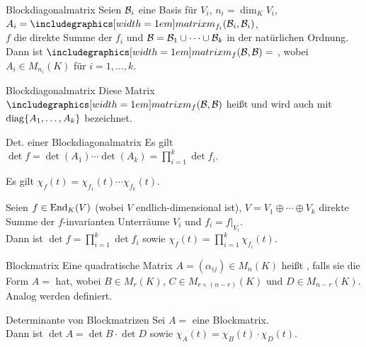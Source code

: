 \begin{Lemma}{Blockdiagonalmatrix}
    Seien $\mathcal{B}_i$ eine Basis für $V_i$, $n_i = \dim_K V_i$,
    $A_i = \matrixm_{f_i}(\basis{B}_i, \basis{B}_i)$, \\
    $f$ die direkte Summe der $f_i$ und
    $\mathcal{B} = \mathcal{B}_1 \cup \cdots \cup \mathcal{B}_k$
    in der natürlichen Ordnung. \\
    Dann ist $\hommatrix{f}{B}{B} =$
    , wobei
    $A_i \in M_{n_i}(K)$ für $i = 1, \ldots, k$.
\end{Lemma}

\begin{Def}{Blockdiagonalmatrix}
    Diese Matrix $\hommatrix{f}{B}{B}$ heißt 
    und wird auch mit $\operatorname{diag}\{A_1, \ldots, A_k\}$ bezeichnet.
\end{Def}

\begin{Satz}{Det. einer Blockdiagonalmatrix}
    Es gilt $\det f = \det(A_1) \cdots \det(A_k) = \prod_{i=1}^k \det f_i$.
\end{Satz}

\begin{Kor}
    Es gilt $\chi_f(t) = \chi_{f_1}(t) \cdots \chi_{f_k}(t)$.
\end{Kor}

\begin{Kor}
    Seien $f \in \operatorname{End}_K(V)$ (wobei $V$ endlich-dimensional ist),
    $V = V_1 \oplus \cdots \oplus V_k$ direkte Summe der $f$-invarianten
    Unterräume $V_i$ und $f_i = f|_{V_i}$. \\
    Dann ist $\det f = \prod_{i=1}^k \det f_i$ sowie
    $\chi_f(t) = \prod_{i=1}^k \chi_{f_i}(t)$.
\end{Kor}

\begin{Def}{Blockmatrix}
    Eine quadratische Matrix $A = (\alpha_{ij}) \in M_n(K)$ heißt
    , falls sie die Form
    $A =$  hat, wobei
    $B \in M_r(K)$, $C \in M_{r \times (n - r)}(K)$ und
    $D \in M_{n - r}(K)$. \\
    Analog werden 
    definiert.
\end{Def}

\begin{Satz}{Determinante von Blockmatrizen}
    Sei $A =$  eine
    Blockmatrix. \\
    Dann ist $\det A = \det B \cdot \det D$ sowie
    $\chi_A(t) = \chi_B(t) \cdot \chi_D(t)$.
\end{Satz}

\pagebreak
